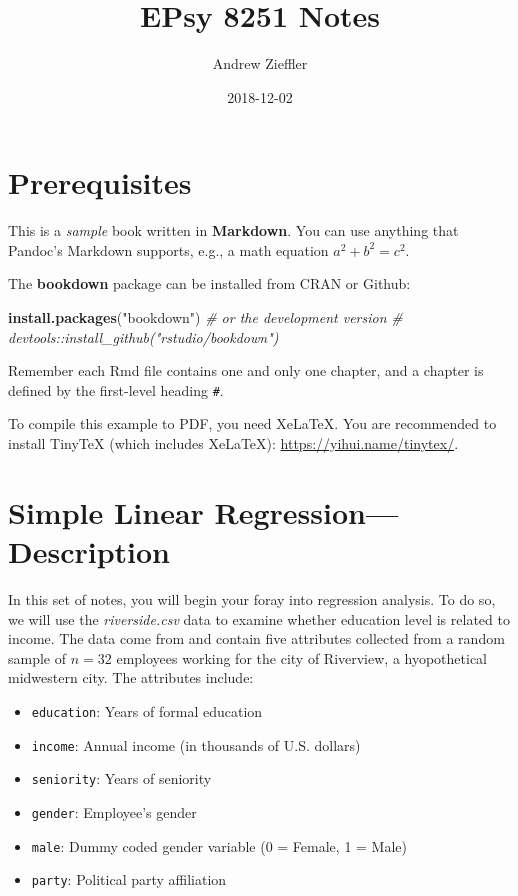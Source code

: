 \documentclass[]{book}
\title{EPsy 8251 Notes}
\author{Andrew Zieffler}
\date{2018-12-02}
\newenvironment{Shaded}{\begin{snugshade}}{\end{snugshade}}
\newcommand{\CommentTok}[1]{\textcolor[rgb]{0.56,0.35,0.01}{\textit{#1}}}
\newcommand{\KeywordTok}[1]{\textcolor[rgb]{0.13,0.29,0.53}{\textbf{#1}}}
\newcommand{\NormalTok}[1]{#1}
\newcommand{\StringTok}[1]{\textcolor[rgb]{0.31,0.60,0.02}{#1}}
\providecommand{\tightlist}{%
  \setlength{\itemsep}{0pt}\setlength{\parskip}{0pt}}
\theoremstyle{definition}
\theoremstyle{definition}
\theoremstyle{definition}
\theoremstyle{remark}
\begin{document}
\maketitle

{
\setcounter{tocdepth}{1}
\tableofcontents
}
\hypertarget{prerequisites}{%
\chapter{Prerequisites}\label{prerequisites}}

This is a \emph{sample} book written in \textbf{Markdown}. You can use
anything that Pandoc's Markdown supports, e.g., a math equation
\(a^2 + b^2 = c^2\).

The \textbf{bookdown} package can be installed from CRAN or Github:

\begin{Shaded}
\begin{Highlighting}[]
\KeywordTok{install.packages}\NormalTok{(}\StringTok{"bookdown"}\NormalTok{)}
\CommentTok{# or the development version}
\CommentTok{# devtools::install_github("rstudio/bookdown")}
\end{Highlighting}
\end{Shaded}

Remember each Rmd file contains one and only one chapter, and a chapter
is defined by the first-level heading \texttt{\#}.

To compile this example to PDF, you need XeLaTeX. You are recommended to
install TinyTeX (which includes XeLaTeX):
\url{https://yihui.name/tinytex/}.

\hypertarget{simple-descript}{%
\chapter{Simple Linear Regression---Description}\label{simple-descript}}

In this set of notes, you will begin your foray into regression
analysis. To do so, we will use the \emph{riverside.csv} data to examine
whether education level is related to income. The data come from
\citet{Lewis-Beck:2016} and contain five attributes collected from a
random sample of \(n=32\) employees working for the city of Riverview, a
hyopothetical midwestern city. The attributes include:

\begin{itemize}
\tightlist
\item
  \texttt{education}: Years of formal education
\item
  \texttt{income}: Annual income (in thousands of U.S. dollars)
\item
  \texttt{seniority}: Years of seniority
\item
  \texttt{gender}: Employee's gender
\item
  \texttt{male}: Dummy coded gender variable (0 = Female, 1 = Male)
\item
  \texttt{party}: Political party affiliation
\end{itemize}
\end{document}
